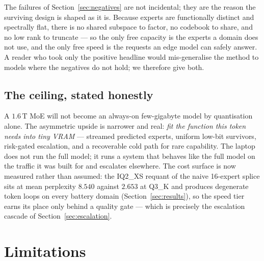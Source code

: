 \documentclass[11pt]{article}
\begin{document}
The failures of Section~\ref{sec:negatives} are not incidental; they are the
reason the surviving design is shaped as it is. Because experts are functionally
distinct and spectrally flat, there is no shared subspace to factor, no codebook
to share, and no low rank to truncate --- so the only free capacity is the
experts a domain does not use, and the only free speed is the requests an edge
model can safely answer. A reader who took only the positive headline would
mis-generalise the method to models where the negatives do not hold; we therefore
give both.

\subsection{The ceiling, stated honestly}

A $1.6\,\textrm{T}$ MoE will not become an always-on few-gigabyte model by
quantisation alone. The asymmetric upside is narrower and real: \emph{fit the
function this token needs into tiny VRAM} --- streamed predicted experts, uniform
low-bit survivors, risk-gated escalation, and a recoverable cold path for rare
capability. The laptop does not run the full model; it runs a system that behaves
like the full model on the traffic it was built for and escalates elsewhere.
The cost surface is now measured rather than assumed: the IQ2\_XS requant of the
naive 16-expert splice sits at mean perplexity $8.540$ against $2.653$ at Q3\_K
and produces degenerate token loops on every battery domain
(Section~\ref{sec:results}), so the speed tier earns its place only behind a
quality gate --- which is precisely the escalation cascade of
Section~\ref{sec:escalation}.

\section{Limitations}
\label{sec:limitations}
\end{document}
